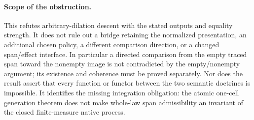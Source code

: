 \documentclass[11pt]{article}
\begin{document}
\paragraph{Scope of the obstruction.}
This refutes arbitrary-dilation descent with the stated outputs and equality strength. It does not rule out a bridge retaining the normalized presentation, an additional chosen policy, a different comparison direction, or a changed span/effect interface. In particular a directed comparison from the empty traced span toward the nonempty image is not contradicted by the empty/nonempty argument; its existence and coherence must be proved separately. Nor does the result assert that every function or functor between the two semantic doctrines is impossible. It identifies the missing integration obligation: the atomic one-cell generation theorem does not make whole-law span admissibility an invariant of the closed finite-measure native process.
\end{document}
